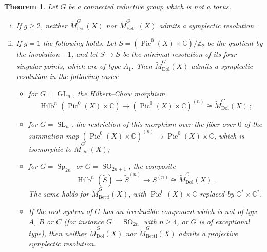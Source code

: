 \documentclass[11pt, a4paper]{amsart}
\newtheorem{theorem}{Theorem}[section]
\theoremstyle{definition}
\theoremstyle{myitemstyle}
\newcommand{\Z}{\mathbb{Z}}
\newcommand{\C}{\mathbb{C}}
\DeclareMathOperator{\Hilb}{\mathrm{Hilb}}
\DeclareMathOperator{\Pic}{Pic}
\DeclareMathOperator{\GL}{GL}
\DeclareMathOperator{\Sp}{Sp}
\DeclareMathOperator{\SO}{SO}
\DeclareMathOperator{\SL}{SL}
\newcommand{\Dol}{{\mathrm{Dol}}}
\newcommand{\Betti}{{\mathrm{Betti}}}
\begin{document}
\begin{theorem}
	\label{thm:classification-resolutions}
	Let $G$ be a connected reductive group which is not a torus.
	\begin{enumerate}[(i)]
		\item If $g\geq2$, neither $\widetilde M^G_\Dol(X)$ nor $\widetilde M^G_\Betti(X)$ admits a symplectic resolution.
		\item If $g=1$ the following holds. Let $S=(\Pic^0(X)\times\C)/\Z_2$ be the quotient by the involution $-1$, and let $\widetilde S\to S$ be the minimal resolution of its four singular points, which are of type $A_1$. Then $\widetilde M^G_\Dol(X)$ admits a symplectic resolution in the following cases:
		\begin{itemize}
			\item for $G=\GL_n$, the Hilbert--Chow morphism
			\[
			\Hilb^n(\Pic^0(X)\times\C)\longrightarrow(\Pic^0(X)\times\C)^{(n)}\cong\widetilde M^G_\Dol(X)\ ;
			\]
			\item for $G=\SL_n$, the restriction of this morphism over the fiber over $0$ of the summation map $(\Pic^0(X)\times\C)^{(n)}\to\Pic^0(X)\times\C$, which is isomorphic to $\widetilde M^G_\Dol(X)$;
			\item for $G=\Sp_{2n}$ or $G=\SO_{2n+1}$, the composite
			\[
			\Hilb^n(\widetilde S)\longrightarrow\widetilde S^{(n)}\longrightarrow S^{(n)}\cong\widetilde M^G_\Dol(X)\ .
			\]The same holds for $\widetilde M^G_\Betti(X)$, with $\Pic^0(X)\times\C$ replaced by $\C^*\times\C^*$.
		\item If the root system of $G$ has an irreducible component which is not of type $A$, $B$ or $C$ (for instance  $G=\SO_{2n}$ with $n\geq4$, or $G$ is of exceptional type), then neither $\widetilde M^G_\Dol(X)$ nor $\widetilde M^G_\Betti(X)$ admits a projective symplectic resolution.
        \end{itemize}
	\end{enumerate}
\end{theorem}
\end{document}

